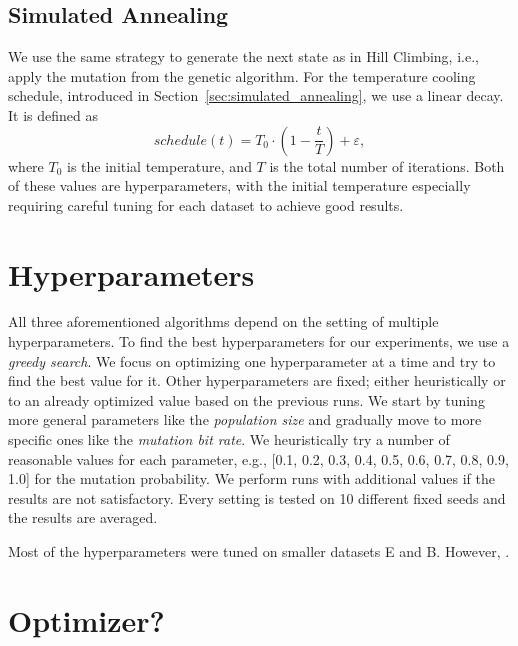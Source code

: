 \subsection*{Simulated Annealing}

We use the same strategy to generate the next state as in Hill Climbing, i.e., apply the mutation from the genetic algorithm. For the temperature cooling schedule, introduced in Section~\ref{sec:simulated_annealing}, we use a linear decay. It is defined as
\begin{equation}
    schedule(t) = T_0 \cdot \left(1 - \frac{t}{T}\right) + \varepsilon,
\end{equation}
where $T_0$ is the initial temperature, and $T$ is the total number of iterations. Both of these values are hyperparameters, with the initial temperature especially requiring careful tuning for each dataset to achieve good results.
\section{Hyperparameters}

All three aforementioned algorithms depend on the setting of multiple hyperparameters. To find the best hyperparameters for our experiments, we use a \textit{greedy search}. We focus on optimizing one hyperparameter at a time and try to find the best value for it. Other hyperparameters are fixed; either heuristically or to an already optimized value based on the previous runs. We start by tuning more general parameters like the \textit{population size} and gradually move to more specific ones like the \textit{mutation bit rate}. We heuristically try a number of reasonable values for each parameter, e.g., [0.1, 0.2, 0.3, 0.4, 0.5, 0.6, 0.7, 0.8, 0.9, 1.0] for the mutation probability. We perform runs with additional values if the results are not satisfactory. Every setting is tested on 10 different fixed seeds and the results are averaged.

Most of the hyperparameters were tuned on smaller datasets E and B. However, .

\section{Optimizer?}
